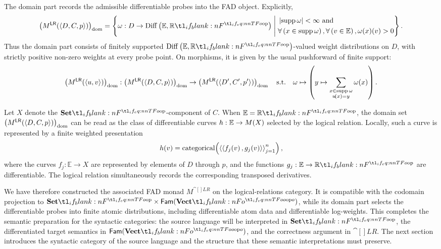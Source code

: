\documentclass[11pt,a4paper]{article}
\theoremstyle{definition}
\theoremstyle{remark}
\providecommand{\Fam}[1]{\mathsf{Fam}(#1)}
\providecommand{\E}{\mathbb{E}}
\providecommand{\supp}{\operatorname{supp}}
\providecommand{\dompt}[1]{\left(#1\right)_{\mathrm{dom}}}
\providecommand{\st}{\;\middle|\;}
\providecommand{\lt}{<}
\providecommand{\gt}{>}
\providecommand{\categ}{\operatorname{categorical}}
\begin{document}
The domain part records the admissible differentiable probes into the FAD
object. Explicitly,
\begin{equation}
	\label{eq:fad-monad-on-lr-object-map-domain-part}
	\dompt{\Fun[nn]{ M^{\cat[]{LR}} }{ \tuple{ D, C, p } }} =
	\left\{
	\omega: D \to \opn{Diff} \left( \E, \R \right)
	\st
	\begin{aligned}
		&\abs{ \supp \omega } \lt \infty
		\text{ and }
		\\
		& \forall \left( x \in \supp \omega \right),
		\forall \left( v \in \E \right),
		\fn[n]{ \fn[n]{ \omega }{ x } }{ v } \gt 0
	\end{aligned}
	\right\}.
\end{equation}
Thus the domain part consists of finitely supported
\(\opn{Diff} \left(\E,\R\right)\)-valued weight distributions on \(D\), with
strictly positive non-zero weights at every probe point. On morphisms, it is
given by the usual pushforward of finite support:
\begin{equation}
	\label{eq:fad-monad-on-lr-morphism-map-domain-part}
	\dompt{\Fun[nn]{ M^{\cat[]{LR}} }{ \tuple{ u, v } }}:
	\dompt{\Fun[nn]{ M^{\cat[]{LR}} }{ \tuple{ D, C, p } }}
	\to
	\dompt{\Fun[nn]{ M^{\cat[]{LR}} }{ \tuple{ D', C', p' } }}
	\qq{s.t.}
	\omega
	\mapsto
	\left(
	y \mapsto
	\sum_{\substack{x \in \supp \omega \\ \fn[n]{ u }{ x } = y}} \fn[n]{ \omega }{ x }
	\right).
\end{equation}

Let \(X\) denote the \( \Set \)-component of \(C\). When \( \E=\R \), the
domain set
\(
\dompt{ \Fun[nn]{ M^{\cat[]{LR}} }{ \tuple{ D, C, p } } }
\)
can be read as the class of differentiable curves
\(h:\E\to\Fun[nn]{M}{X}\) selected by the logical relation. Locally, such a
curve is represented by a finite weighted presentation
\begin{equation*}
	\fn[n]{ h }{ v } =
	\fn[n]{ \categ }{
		\tuple{ \tuple{ \fn[n]{ f_{j} }{ v }, \fn[n]{ g_{j} }{ v } } }_{j = 1}^{n}
	},
\end{equation*}
where the curves \( f_j:\E\to X \) are represented by elements of \(D\) through
\(p\), and the functions \( g_j:\E\to\R \) are differentiable. The logical
relation simultaneously records the corresponding transposed derivatives.

We have therefore constructed the associated FAD monad
\(M^{\cat[]{LR}}\) on the logical-relations category. It is compatible with the
codomain projection to \( \Set\times\Fam{\Vect[o]} \), while its domain part
selects the differentiable probes into finite atomic distributions, including
differentiable atom data and differentiable log-weights. This completes the
semantic preparation for the syntactic categories: the source language will be
interpreted in \( \Set \), the differentiated target semantics in
\( \Fam{\Vect[o]} \), and the correctness argument in \( \cat[]{LR} \). The
next section introduces the syntactic category of the source language and the
structure that these semantic interpretations must preserve.
\end{document}
